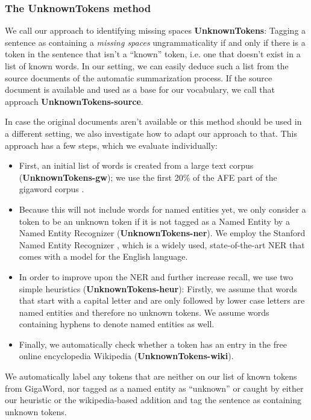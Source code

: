 \documentclass[a4paper,10pt]{scrartcl}
\theoremstyle{style}
\begin{document}
\subsubsection{The UnknownTokens method}
We call our approach to identifying missing spaces \textbf{UnknownTokens}: Tagging a sentence as containing a \textit{missing spaces} ungrammaticality if and only if there is a token in the sentence that isn't a ``known'' token, i.e. one that doesn't exist in a list of known words. In our setting, we can easily deduce such a list from the source documents of the automatic summarization process. If the source document is available and used as a base for our vocabulary, we call that approach \textbf{UnknownTokens-source}.

In case the original documents aren't available or this method should be used in a different setting, we also investigate how to adapt our approach to that. This approach has a few steps, which we evaluate individually:

\begin{itemize}
\item First, an initial list of words is created from a large text corpus (\textbf{UnknownTokens-gw}); we use the first 20\% of the AFE part of the gigaword corpus \citep{gigaword}.

\item Because this will not include words for named entities yet, we only consider a token to be an unknown token if it is not tagged as a Named Entity by a Named Entity Recognizer (\textbf{UnknownTokens-ner}). We employ the Stanford Named Entity Recognizer \citep{stanfordNER}, which is a widely used, state-of-the-art NER that comes with a model for the English language.

\item In order to improve upon the NER and further increase recall, we use two simple heuristics (\textbf{UnknownTokens-heur}): Firstly, we assume that words that start with a capital letter and are only followed by lower case letters are named entities and therefore no unknown tokens. We assume words containing hyphens to denote named entities as well. 

\item Finally, we automatically check whether a token has an entry in the free online encyclopedia Wikipedia (\textbf{UnknownTokens-wiki}).

\end{itemize}

We automatically label any tokens that are neither on our list of known tokens from GigaWord, nor tagged as a named entity as ``unknown'' or caught by either our heuristic or the wikipedia-based addition and tag the sentence as containing unknown tokens.
\end{document}

